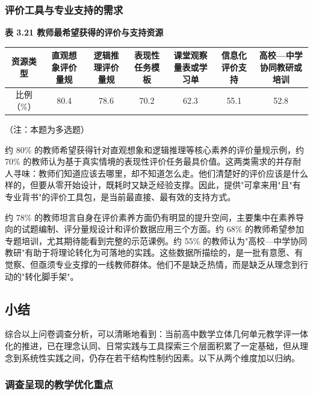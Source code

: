 \documentclass[UTF8,a4paper,12pt,twoside]{ctexart}
\begin{document}
\subsubsection{评价工具与专业支持的需求}

\textbf{表 3.21 教师最希望获得的评价与支持资源}

\begin{center}
\begin{tabular}{|c|c|c|c|c|c|c|}
\hline
资源类型 & 直观想象评价量规 & 逻辑推理评价量规 & 表现性任务模板 & 课堂观察量表或学习单 & 信息化评价支持 & 高校—中学协同教研或培训 \\
\hline
比例（\%） & 80.4 & 78.6 & 70.2 & 62.3 & 55.1 & 52.8 \\
\hline
\end{tabular}
\end{center}

（注：本题为多选题）

约 80\% 的教师希望获得针对直观想象和逻辑推理等核心素养的评价量规示例，约 70\% 的教师认为基于真实情境的表现性评价任务最具价值。这两类需求的并存耐人寻味：教师们知道应该去哪里，却不知道怎么走。他们清楚好的评价应该是什么样的，但要从零开始设计，既耗时又缺乏经验支撑。因此，提供"可拿来用"且"有专业背书"的评价工具包，是当前最直接、最有效的支持方式。

约 78\% 的教师坦言自身在评价素养方面仍有明显的提升空间，主要集中在素养导向的试题编制、评分量规设计和评价数据应用三个方面。约 68\% 的教师希望参加专题培训，尤其期待能看到完整的示范课例。约 55\% 的教师认为"高校—中学协同教研"有助于将理论转化为可落地的实践。这些数据所描绘的，是一批有意愿、有觉察、但亟须专业支撑的一线教师群体。他们不是缺乏热情，而是缺乏从理念到行动的"转化脚手架"。

\subsection{小结}

综合以上问卷调查分析，可以清晰地看到：当前高中数学立体几何单元教学评一体化的推进，已在理念认同、日常实践与工具探索三个层面积累了一定基础，但从理念到系统性实践之间，仍存在若干结构性制约因素。以下从两个维度加以归纳。

\subsubsection{调查呈现的教学优化重点}
\end{document}
